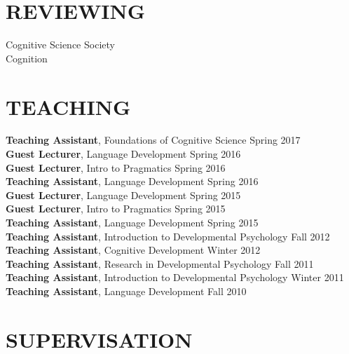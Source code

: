 \documentclass[margin, 7pt]{res} %
\begin{document}
\begin{resume}

\section{REVIEWING}
Cognitive Science Society  \\
Cognition \\



\section{TEACHING} 
{\bf Teaching Assistant}, Foundations of Cognitive Science \hfill Spring 2017 \\
{\bf Guest Lecturer}, Language Development \hfill Spring 2016 \\
{\bf Guest Lecturer}, Intro to Pragmatics \hfill Spring 2016 \\
{\bf Teaching Assistant}, Language Development	\hfill Spring 2016 \\
{\bf Guest Lecturer}, Language Development \hfill Spring 2015 \\
{\bf Guest Lecturer}, Intro to Pragmatics \hfill Spring 2015 \\
{\bf Teaching Assistant}, Language Development	\hfill Spring 2015 \\
{\bf Teaching Assistant}, Introduction to Developmental Psychology \hfill	 Fall 2012 \\
{\bf Teaching Assistant}, Cognitive Development 	\hfill Winter 2012 \\
{\bf Teaching Assistant}, Research in Developmental Psychology	\hfill Fall 2011 \\
{\bf Teaching Assistant}, Introduction to Developmental Psychology 	\hfill Winter 2011 \\
{\bf Teaching Assistant}, Language Development 	\hfill Fall 2010 \\



\section{SUPERVISATION}


\end{resume}
\end{document}
